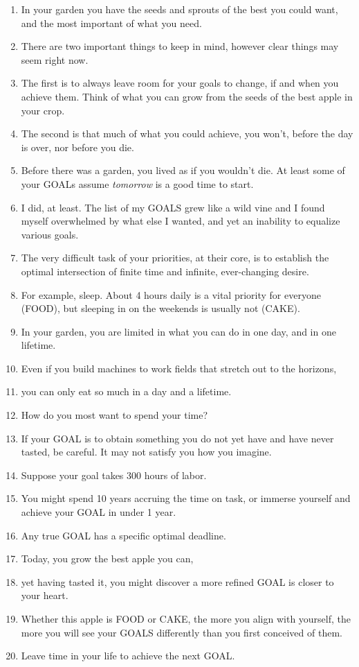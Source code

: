 \documentclass[
]{book}
\providecommand{\tightlist}{%
  \setlength{\itemsep}{0pt}\setlength{\parskip}{0pt}}
\begin{document}
\begin{enumerate}
\def\labelenumi{\arabic{enumi}.}
\tightlist
\item
  In your garden you have the seeds and sprouts of the best you could want, and the most important of what you need.
\item
  There are two important things to keep in mind, however clear things may seem right now.\\
\item
  The first is to always leave room for your goals to change, if and when you achieve them. Think of what you can grow from the seeds of the best apple in your crop.
\item
  The second is that much of what you could achieve, you won't, before the day is over, nor before you die.
\item
  Before there was a garden, you lived as if you wouldn't die. At least some of your GOALs assume \emph{tomorrow} is a good time to start.\\
\item
  I did, at least. The list of my GOALS grew like a wild vine and I found myself
  overwhelmed by what else I wanted, and yet an inability to equalize various
  goals.
\item
  The very difficult task of your priorities, at their core, is to establish the optimal intersection of finite time and infinite, ever-changing desire.
\item
  For example, sleep. About 4 hours daily is a vital priority for everyone (FOOD), but sleeping in on the weekends is usually not (CAKE).
\item
  In your garden, you are limited in what you can do in one day, and in one lifetime.
\item
  Even if you build machines to work fields that stretch out to the horizons,
\item
  you can only eat so much in a day and a lifetime.
\item
  How do you most want to spend your time?
\item
  If your GOAL is to obtain something you do not yet have and have never
  tasted, be careful. It may not satisfy you how you imagine.
\item
  Suppose your goal takes 300 hours of labor.
\item
  You might spend 10 years accruing the time on task, or immerse yourself
  and achieve your GOAL in under 1 year.
\item
  Any true GOAL has a specific optimal deadline.
\item
  Today, you grow the best apple you can,
\item
  yet having tasted it, you might discover a more refined GOAL is closer to
  your heart.
\item
  Whether this apple is FOOD or CAKE, the more you align with yourself, the
  more you will see your GOALS differently than you first conceived of them.
\item
  Leave time in your life to achieve the next GOAL.
\end{enumerate}
\end{document}
